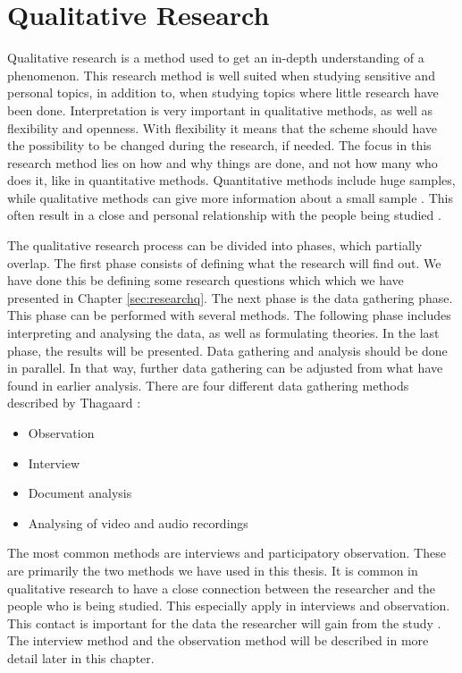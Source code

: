\section{Qualitative Research}
Qualitative research is a method used to get an in-depth understanding of a phenomenon. This research method is well suited when studying sensitive and personal topics, in addition to, when studying topics where little research have been done. Interpretation is very important in qualitative methods, as well as flexibility and openness. With flexibility it means that the scheme should have the possibility to be changed during the research, if needed. The focus in this research method lies on how and why things are done, and not how many who does it, like in quantitative methods. Quantitative methods include huge samples, while qualitative methods can give more information about a small sample \cite{qualitative}. This often result in a close and personal relationship with the people being studied \cite{tjora}.  

The qualitative research process can be divided into phases, which partially overlap. The first phase consists of defining what the research will find out. We have done this be defining some research questions which which we have presented in Chapter \ref{sec:researchq}. The next phase is the data gathering phase. This phase can be performed with several methods. The following phase includes interpreting and analysing the data, as well as formulating theories. In the last phase, the results will be presented. Data gathering and analysis should be done in parallel. In that way, further data gathering can be adjusted from what have found in earlier analysis. There are four different data gathering methods described by Thagaard \cite{qualitative}:

\begin{itemize}
\item Observation 
\item Interview  
\item Document analysis
\item Analysing of video and audio recordings
\end{itemize}


The most common methods are interviews and participatory observation. These are primarily the two methods we have used in this thesis. It is common in qualitative research to have a close connection between the researcher and the people who is being studied. This especially apply in interviews and observation. This contact is important for the data the researcher will gain from the study \cite{qualitative}. The interview method and the observation method will be described in more detail later in this chapter.

